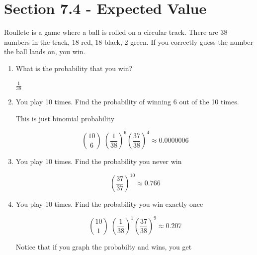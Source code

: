 \documentclass[../../Main.tex]{subfiles}
\begin{document}
\section{Section 7.4 - Expected Value}

\begin{example}
    Roullete is a game where a ball is rolled on a circular track. 
    There are 38 numbers in the track, 18 red, 18 black, 2 green. 
    If you correctly guess the number the ball lands on, you win.

    \begin{enumerate}
        \item
        {
            What is the probability that you win?

            $\boxed{\frac{1}{38}}$
        }

        \item
        {
            You play 10 times. Find the probability of winning 6 out of the 10 times.

            This is just binomial probability

            $${10 \choose 6} \; \left(\frac{1}{38}\right)^6 \left(\frac{37}{38}\right)^4 \approx \boxed{0.0000006}$$ 
        }

        \item
        {
            You play 10 times. Find the probability you never win

            $$\left(\frac{37}{37}\right)^{10} \approx \boxed{0.766}$$
        }
        \item
        {
            You play 10 times. Find the probability you win exactly once

            $${10 \choose 1} \; \left(\frac{1}{38}\right)^1 \left(\frac{37}{38}\right)^9 \approx \boxed{0.207}$$ 
        }
        
        Notice that if you graph the probabilty and wins, you get



\end{enumerate}
\end{example}
\end{document}
